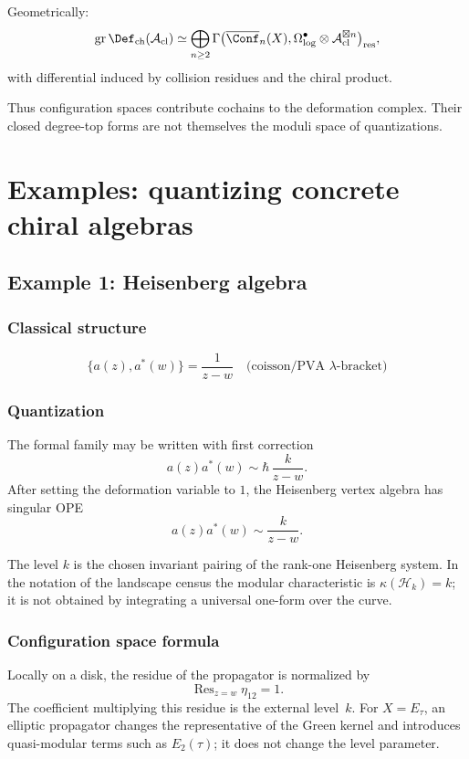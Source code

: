 Geometrically:
\[
\operatorname{gr}\Def_{\mathrm{ch}}(\mathcal{A}_{\text{cl}})
\simeq
\bigoplus_{n\geq2}
\Gamma\bigl(\overline{\Conf}_n(X),
\Omega^\bullet_{\log}\otimes\mathcal A_{\mathrm{cl}}^{\boxtimes n}\bigr)_{\mathrm{res}},
\]
with differential induced by collision residues and the chiral product.

Thus configuration spaces contribute cochains to the deformation
complex. Their closed degree-top forms are not themselves the moduli
space of quantizations.

\section{Examples: quantizing concrete chiral algebras}

\subsection{Example 1: Heisenberg algebra}

\subsubsection{Classical structure}

\[\{a(z), a^*(w)\} = \frac{1}{z-w} \quad \text{(coisson/PVA $\lambda$-bracket)}\]

\subsubsection{Quantization}

The formal family may be written with first correction
\[
a(z)a^*(w)
\sim
\hbar\,\frac{k}{z-w}.
\]
After setting the deformation variable to \(1\), the Heisenberg vertex
algebra has singular OPE
\[
a(z)a^*(w)\sim\frac{k}{z-w}.
\]

The level $k$ is the chosen invariant pairing of the rank-one
Heisenberg system. In the notation of the landscape census the modular
characteristic is $\kappa(\mathcal H_k)=k$; it is not obtained by
integrating a universal one-form over the curve.

\subsubsection{Configuration space formula}

Locally on a disk, the residue of the propagator is normalized by
\[
\operatorname{Res}_{z=w}\eta_{12}=1.
\]
The coefficient multiplying this residue is the external level~$k$.
For $X=E_\tau$, an elliptic propagator changes the representative of
the Green kernel and introduces quasi-modular terms such as $E_2(\tau)$;
it does not change the level parameter.


